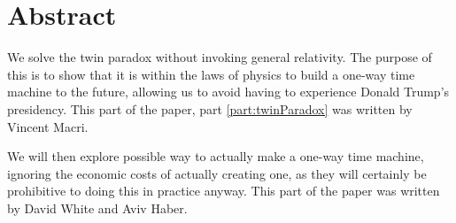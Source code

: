 \chapter*{Abstract}
	We solve the twin paradox without invoking general relativity. The purpose of this is to show that it is within the laws of physics to build a one-way time machine to the future, allowing us to avoid having to experience Donald Trump's presidency. This part of the paper, part \ref{part:twinParadox} was written by Vincent Macri.

	We will then explore possible way to actually make a one-way time machine, ignoring the economic costs of actually creating one, as they will certainly be prohibitive to doing this in practice anyway. This part of the paper was written by David White and Aviv Haber.
